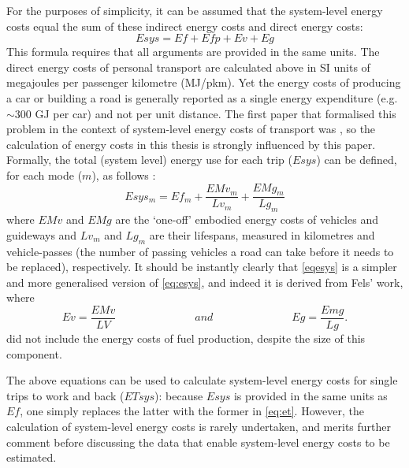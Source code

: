 For the purposes of simplicity, it can be assumed that the system-level energy
costs equal the sum of these indirect energy costs and direct energy costs:
\begin{equation}
 Esys = Ef + Efp + Ev + Eg
 \label{eqesys}
\end{equation}
This formula requires that all arguments are provided in the same units.
The direct energy costs of personal transport are calculated above in SI
units of megajoules per passenger kilometre (MJ/pkm). Yet the energy costs of
producing a car or building a road is generally reported as a single energy
expenditure (e.g.~$\sim$300 GJ per car) and not per unit distance.
The first paper that formalised this problem in the context of system-level
energy costs of transport was \citep{Fels1975}, so the calculation of
energy costs in this thesis is strongly influenced by this paper.
Formally, the total (system level) energy use for each trip ($Esys$) can be
defined, for each mode ($m$), as follows \citet{Fels1975}:
\begin{equation}
Esys_m =  Ef_m +  \frac{EMv_m}{Lv_m} + \frac{EMg_m}{Lg_m}
\label{eq:esys}
\end{equation}
where $EMv$ and $EMg$ are the `one-off' embodied energy costs of
vehicles and guideways and
$Lv_m$ and $Lg_m$ are their lifespans,
measured in kilometres and vehicle-passes (the number of passing vehicles a road
can take before it needs to be replaced), respectively.
It should be instantly clearly that \cref{eqesys} is a simpler and
more generalised version
of \cref{eq:esys}, and indeed it is derived from Fels' work, where
\begin{equation}
 Ev = \frac{EMv}{LV} \hspace{3cm} and  \hspace{3cm} Eg =
\frac{Emg}{Lg}.
\end{equation}
\citet{Fels1975} did not include the energy costs of fuel production, despite
the size of this component.

The above equations can be used to calculate
system-level energy costs for single trips to work and back ($ETsys$):
because $Esys$ is provided in the same units as $Ef$, one simply replaces the
latter with the former in \cref{eq:et}. %
However, the calculation of
system-level energy costs is rarely undertaken, and merits further comment
before
discussing the data that enable system-level energy costs to be estimated. 

